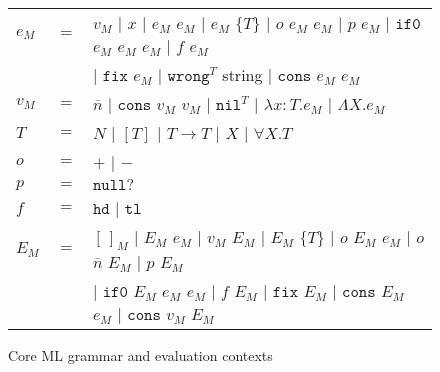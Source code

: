 \begin{figure}[p]
\centering
\begin{tabular}{lcl}
\vspace{5pt}

$e_{M}$ & $=$ & $v_{M}$ $\vert$ $x$ $\vert$ $e_{M}$ $e_{M}$ $\vert$ $e_{M}$ $\lbrace T\rbrace$ $\vert$ $o$ $e_{M}$ $e_{M}$ $\vert$ $p$ $e_{M}$ $\vert$ $\mathtt{if0}$ $e_{M}$ $e_{M}$ $e_{M}$ $\vert$ $f$ $e_{M}$ \\

\vspace{5pt}

&& $\vert$ $\mathtt{fix}$ $e_{M}$ $\vert$ $\mathtt{wrong}^{T}$ string $\vert$ $\mathtt{cons}$ $e_{M}$ $e_{M}$ \\

\vspace{5pt}

$v_{M}$ & $=$ & $\overline{n}$ $\vert$ $\mathtt{cons}$ $v_{M}$ $v_{M}$ $\vert$ $\mathtt{nil}^{T}$ $\vert$ $\lambda x:T.e_{M}$ $\vert$ $\Lambda X.e_{M}$ \\

\vspace{5pt}

$T$ & $=$ & $N$ $\vert$ $[T]$ $\vert$ $T\rightarrow T$ $\vert$ $X$ $\vert$ $\forall X.T$ \\

\vspace{5pt}

$o$ & $=$ & $+$ $\vert$ $-$ \\

\vspace{5pt}

$p$ & $=$ & $\mathtt{null?}$ \\

\vspace{5pt}

$f$ & $=$ & $\mathtt{hd}$ $\vert$ $\mathtt{tl}$ \\

\vspace{5pt}

$E_{M}$ & $=$ & $[\,]_{M}$ $\vert$ $E_{M}$ $e_{M}$ $\vert$ $v_{M}$ $E_{M}$ $\vert$ $E_{M}$ $\lbrace T\rbrace$ $\vert$ $o$ $E_{M}$ $e_{M}$ $\vert$ $o$ $\overline{n}$ $E_{M}$ $\vert$ $p$ $E_{M}$ \\

\vspace{5pt}

&& $\vert$ $\mathtt{if0}$ $E_{M}$ $e_{M}$ $e_{M}$ $\vert$ $f$ $E_{M}$ $\vert$ $\mathtt{fix}$ $E_{M}$ $\vert$ $\mathtt{cons}$ $E_{M}$ $e_{M}$ $\vert$ $\mathtt{cons}$ $v_{M}$ $E_{M}$
\end{tabular}
\caption{Core ML grammar and evaluation contexts}
\label{cmg}
\end{figure}